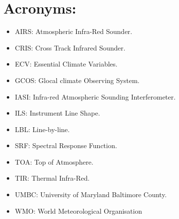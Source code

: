 \documentclass[twocolumn,10pt]{article}
\begin{document}
\section{Acronyms:}
\begin{itemize}
\item AIRS: Atmospheric Infra-Red Sounder.
\item CRIS: Cross Track Infrared Sounder.
\item ECV: Essential Climate Variables.
\item GCOS: Glocal climate Observing System.
\item IASI: Infra-red Atmospheric Sounding Interferometer.
\item ILS: Instrument Line Shape.
\item LBL: Line-by-line.
\item SRF: Spectral Response Function.
\item TOA: Top of Atmosphere.
\item TIR: Thermal Infra-Red.
\item UMBC: University of Maryland Baltimore County.
\item WMO: World Meteorological Organisation
\end{itemize}
\end{document}
